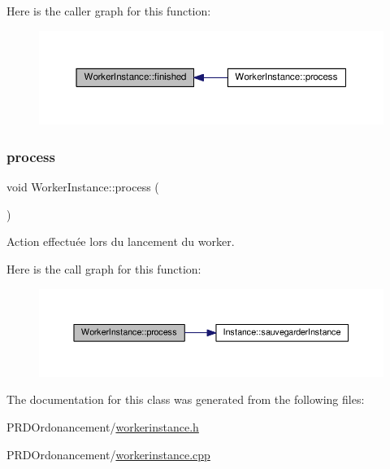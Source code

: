 Here is the caller graph for this function\+:\nopagebreak
\begin{figure}[H]
\begin{center}
\leavevmode
\includegraphics[width=350pt]{classWorkerInstance_ac9e45034de2450472fcc07ba0b960000_icgraph}
\end{center}
\end{figure}
\mbox{\label{classWorkerInstance_ab9005529d8aa529d74226d8e4a1e9f3f}} 
\subsubsection{\texorpdfstring{process}{process}}
{\footnotesize\ttfamily void Worker\+Instance\+::process (\begin{DoxyParamCaption}{ }\end{DoxyParamCaption})\hspace{0.3cm}{\ttfamily [slot]}}



Action effectuée lors du lancement du worker. 

Here is the call graph for this function\+:\nopagebreak
\begin{figure}[H]
\begin{center}
\leavevmode
\includegraphics[width=350pt]{classWorkerInstance_ab9005529d8aa529d74226d8e4a1e9f3f_cgraph}
\end{center}
\end{figure}


The documentation for this class was generated from the following files\+:\begin{DoxyCompactItemize}
\item 
P\+R\+D\+Ordonancement/\hyperlink{workerinstance_8h}{workerinstance.\+h}\item 
P\+R\+D\+Ordonancement/\hyperlink{workerinstance_8cpp}{workerinstance.\+cpp}\end{DoxyCompactItemize}
